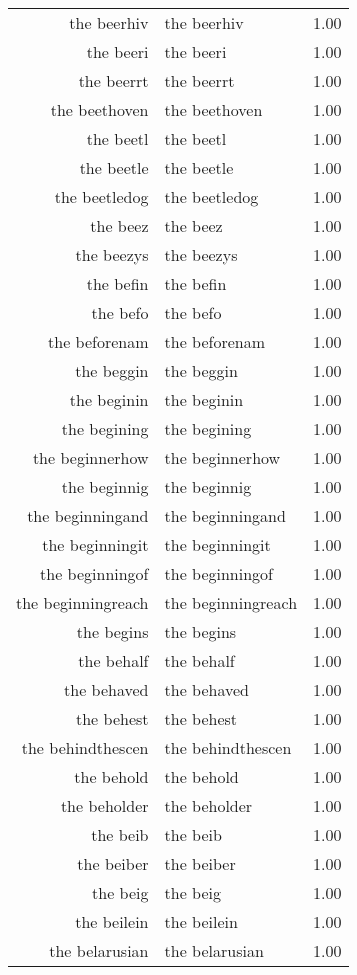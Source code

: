 \begin{table}[ht]
\begin{tabular}{rlr}
  the beerhiv & the beerhiv & 1.00 \\ 
  the beeri & the beeri & 1.00 \\ 
  the beerrt & the beerrt & 1.00 \\ 
  the beethoven & the beethoven & 1.00 \\ 
  the beetl & the beetl & 1.00 \\ 
  the beetle & the beetle & 1.00 \\ 
  the beetledog & the beetledog & 1.00 \\ 
  the beez & the beez & 1.00 \\ 
  the beezys & the beezys & 1.00 \\ 
  the befin & the befin & 1.00 \\ 
  the befo & the befo & 1.00 \\ 
  the beforenam & the beforenam & 1.00 \\ 
  the beggin & the beggin & 1.00 \\ 
  the beginin & the beginin & 1.00 \\ 
  the begining & the begining & 1.00 \\ 
  the beginnerhow & the beginnerhow & 1.00 \\ 
  the beginnig & the beginnig & 1.00 \\ 
  the beginningand & the beginningand & 1.00 \\ 
  the beginningit & the beginningit & 1.00 \\ 
  the beginningof & the beginningof & 1.00 \\ 
  the beginningreach & the beginningreach & 1.00 \\ 
  the begins & the begins & 1.00 \\ 
  the behalf & the behalf & 1.00 \\ 
  the behaved & the behaved & 1.00 \\ 
  the behest & the behest & 1.00 \\ 
  the behindthescen & the behindthescen & 1.00 \\ 
  the behold & the behold & 1.00 \\ 
  the beholder & the beholder & 1.00 \\ 
  the beib & the beib & 1.00 \\ 
  the beiber & the beiber & 1.00 \\ 
  the beig & the beig & 1.00 \\ 
  the beilein & the beilein & 1.00 \\ 
  the belarusian & the belarusian & 1.00 \\ 

\end{tabular}
\end{table}
